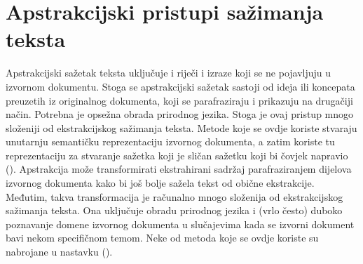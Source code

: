 \documentclass[times, utf8, zavrsni, numeric]{fer}
\begin{document}
\section{Apstrakcijski pristupi sažimanja teksta}
Apstrakcijski sažetak teksta uključuje i riječi i izraze koji se ne pojavljuju u izvornom dokumentu.
Stoga se apstrakcijski sažetak sastoji od ideja ili koncepata preuzetih iz originalnog dokumenta, koji se parafraziraju i prikazuju na drugačiji način.
Potrebna je opsežna obrada prirodnog jezika. Stoga je ovaj pristup mnogo složeniji od ekstrakcijskog sažimanja teksta.
Metode koje se ovdje koriste stvaraju unutarnju semantičku reprezentaciju izvornog dokumenta, a zatim koriste tu reprezentaciju za stvaranje sažetka koji je sličan sažetku koji bi čovjek napravio (\citet{wiki1}).
Apstrakcija može transformirati ekstrahirani sadržaj parafraziranjem dijelova izvornog dokumenta kako bi još bolje sažela tekst od obične ekstrakcije.
Međutim, takva transformacija je računalno mnogo složenija od ekstrakcijskog sažimanja teksta. Ona uključuje obradu prirodnog jezika i (vrlo često) duboko poznavanje domene izvornog dokumenta u slučajevima kada se izvorni dokument bavi nekom specifičnom temom.
Neke od metoda koje se ovdje koriste su nabrojane u nastavku (\citet{article2}).
\end{document}
